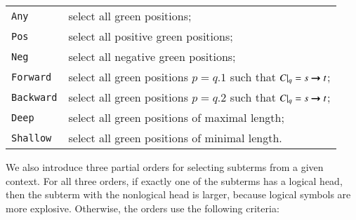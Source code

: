 \begin{tabular}{ll}
\texttt{Any} &  select all green positions; \\
\texttt{Pos} &  select all positive green positions; \\
\texttt{Neg} &  select all negative green positions; \\
\texttt{Forward} &  select all green positions $p = q.1$ such that $C|_q = s \pmb{\rightarrow} t$; \\
\texttt{Backward} &  select all green positions $p = q.2$ such that $C|_q = s \pmb{\rightarrow} t$; \\
\texttt{Deep} &  select all green positions of maximal length; \\
\texttt{Shallow} &  select all green positions of minimal length.   \\
\end{tabular}

\smallskip
{}
We also introduce three partial orders for selecting subterms from a given
context. For all three orders, if exactly one of the subterms has a logical head,
then the subterm with the nonlogical head is larger, because logical symbols
are more explosive. Otherwise, the orders use the following criteria:
%


